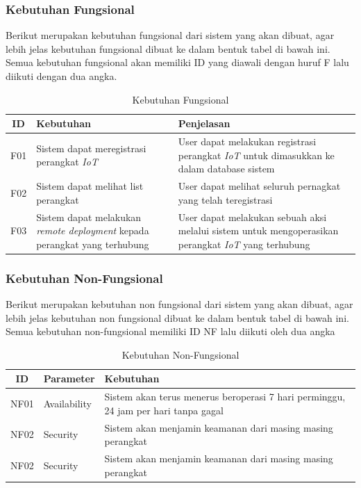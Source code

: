 \pagebreak

\subsubsection{Kebutuhan Fungsional}
Berikut merupakan kebutuhan fungsional dari sistem yang akan dibuat, agar lebih jelas kebutuhan fungsional dibuat ke dalam bentuk tabel di bawah ini. Semua kebutuhan fungsional akan memiliki ID yang diawali dengan huruf F lalu diikuti dengan dua angka.
\begin{table}[h]
  \caption{Kebutuhan Fungsional}
  \label{tab:kebutuhan-fungsional}
  \centering
  \begin{tabular}{|c|p{4.5cm}|p{4.5cm}|}
    \hline
    ID  & Kebutuhan                                                                         & Penjelasan                                                                                                 \\
    \hline
    F01 & Sistem dapat meregistrasi perangkat \textit{IoT}                                  & User dapat melakukan registrasi perangkat \textit{IoT} untuk dimasukkan ke dalam database sistem           \\
    \hline
    F02 & Sistem dapat melihat list perangkat                                               & User dapat melihat seluruh pernagkat yang telah teregistrasi                                               \\
    \hline
    F03 & Sistem dapat melakukan \textit{remote deployment} kepada perangkat yang terhubung & User dapat melakukan sebuah aksi melalui sistem untuk mengoperasikan perangkat \textit{IoT} yang terhubung \\
    \hline
  \end{tabular}
\end{table}


\subsubsection{Kebutuhan Non-Fungsional}
Berikut merupakan kebutuhan non fungsional dari sistem yang akan dibuat, agar lebih jelas kebutuhan non fungsional dibuat ke dalam bentuk tabel di bawah ini. Semua kebutuhan non-fungsional memiliki ID NF lalu diikuti oleh dua angka
\begin{table}[h]
  \caption{Kebutuhan Non-Fungsional}
  \label{tab:kebutuhan-non-fungsional}
  \centering
  \begin{tabular}{|c|p{4.5cm}|p{4.5cm}|}
    \hline
    ID   & Parameter    & Kebutuhan                                                  \\
    \hline
    NF01 & Availability & Sistem akan terus menerus beroperasi 7 hari
    perminggu, 24 jam per hari tanpa gagal                                           \\
    \hline
    NF02 & Security     & Sistem akan menjamin keamanan dari masing masing perangkat \\
    \hline
    NF02 & Security     & Sistem akan menjamin keamanan dari masing masing perangkat \\
    \hline
  \end{tabular}
\end{table}

